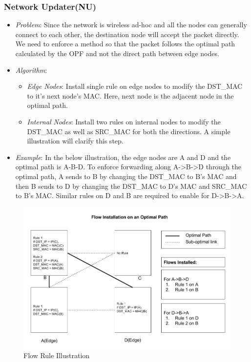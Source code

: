 \documentclass{article}
\begin{document}
\subsubsection{Network Updater(NU)}
\begin{itemize}
\item \textit{Problem}: Since the network is wireless ad-hoc and all the nodes can generally connect to each other, the
destination node will accept the packet directly. We need to enforce a method so that the packet follows the optimal
path calculated by the OPF and not the direct path between edge nodes.
\item \textit{Algorithm}: 
\begin{itemize}
\item \textit{Edge Nodes}: Install single rule on edge nodes to modify the DST\_MAC to it’s next node’s MAC. Here, next
node is the adjacent node in the optimal path.
\item \textit{Internal Nodes}: Install two rules on internal nodes to modify the DST\_MAC as well as SRC\_MAC for both the
directions. A simple illustration will clarify this step. 
\end{itemize}
\item \textit{Example}: In the below illustration, the edge nodes are A and D and the optimal path is A-B-D. To enforce
forwarding along A->B->D through the optimal path, A sends to B by changing the DST\_MAC to B’s MAC and then B sends to D
by changing the DST\_MAC to D’s MAC and SRC\_MAC to B’s MAC. Similar rules on D and B are required to enable for D->B->A. 
\end{itemize}
\begin{figure}[H]
\caption{Flow Rule Illustration}
\centering
\includegraphics[width=\textwidth]{NU_Algorithm_Example}
\end{figure}
\end{document}
